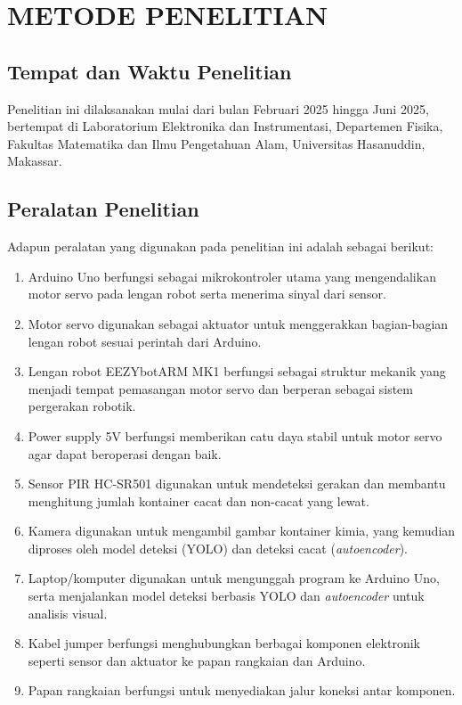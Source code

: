 \chapter{METODE PENELITIAN}
\section{Tempat dan Waktu Penelitian}
Penelitian ini dilaksanakan mulai dari bulan Februari 2025 hingga Juni
2025, bertempat di Laboratorium Elektronika dan Instrumentasi,
Departemen Fisika, Fakultas Matematika dan Ilmu Pengetahuan Alam,
Universitas Hasanuddin, Makassar.

\vspace{1em}

\section{Peralatan Penelitian}
Adapun peralatan yang digunakan pada penelitian ini adalah sebagai berikut:
\begin{enumerate}
  \item Arduino Uno berfungsi sebagai mikrokontroler utama yang
    mengendalikan motor servo pada lengan robot serta menerima sinyal
    dari sensor.
  \item Motor servo digunakan sebagai aktuator untuk menggerakkan
    bagian-bagian lengan robot sesuai perintah dari Arduino.
  \item Lengan robot EEZYbotARM MK1 berfungsi sebagai struktur
    mekanik yang menjadi tempat pemasangan motor servo dan berperan
    sebagai sistem pergerakan robotik.
  \item Power supply 5V berfungsi memberikan catu daya stabil untuk
    motor servo agar dapat beroperasi dengan baik.
  \item Sensor PIR HC-SR501 digunakan untuk mendeteksi gerakan dan membantu
    menghitung jumlah kontainer cacat dan non-cacat yang lewat.
  \item Kamera digunakan untuk mengambil gambar kontainer kimia, yang
    kemudian diproses oleh model deteksi (YOLO) dan deteksi cacat
    (\textit{autoencoder}).
  \item Laptop/komputer digunakan untuk mengunggah program ke Arduino
    Uno, serta menjalankan model deteksi berbasis YOLO dan
    \textit{autoencoder} untuk analisis visual.
  \item Kabel jumper berfungsi menghubungkan berbagai komponen
    elektronik seperti sensor dan aktuator ke papan rangkaian dan
    Arduino.
  \item Papan rangkaian berfungsi untuk menyediakan jalur koneksi
    antar komponen.
\end{enumerate}

